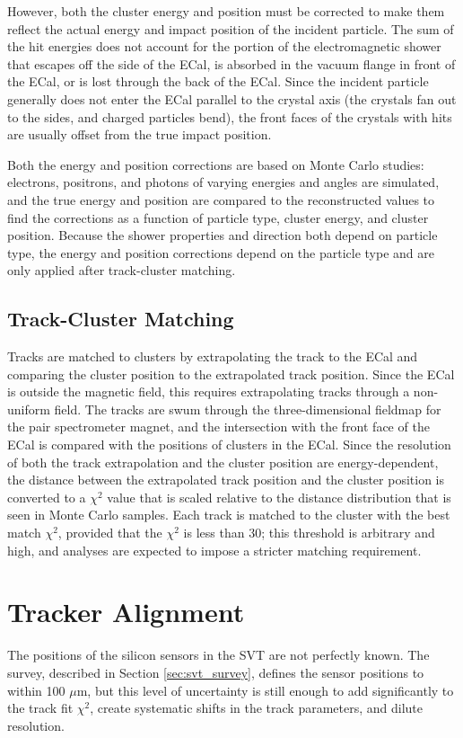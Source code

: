 However, both the cluster energy and position must be corrected to make them reflect the actual energy and impact position of the incident particle.
The sum of the hit energies does not account for the portion of the electromagnetic shower that escapes off the side of the ECal, is absorbed in the vacuum flange in front of the ECal, or is lost through the back of the ECal.
Since the incident particle generally does not enter the ECal parallel to the crystal axis (the crystals fan out to the sides, and charged particles bend), the front faces of the crystals with hits are usually offset from the true impact position.

Both the energy and position corrections are based on Monte Carlo studies: electrons, positrons, and photons of varying energies and angles are simulated, and the true energy and position are compared to the reconstructed values to find the corrections as a function of particle type, cluster energy, and cluster position.
Because the shower properties and direction both depend on particle type, the energy and position corrections depend on the particle type and are only applied after track-cluster matching.

\subsection{Track-Cluster Matching}
\label{sec:matching}
Tracks are matched to clusters by extrapolating the track to the ECal and comparing the cluster position to the extrapolated track position.
Since the ECal is outside the magnetic field, this requires extrapolating tracks through a non-uniform field.
The tracks are swum through the three-dimensional fieldmap for the pair spectrometer magnet, and the intersection with the front face of the ECal is compared with the positions of clusters in the ECal.
Since the resolution of both the track extrapolation and the cluster position are energy-dependent, the distance between the extrapolated track position and the cluster position is converted to a $\chi^2$ value that is scaled relative to the distance distribution that is seen in Monte Carlo samples.
Each track is matched to the cluster with the best match $\chi^2$, provided that the $\chi^2$ is less than 30; this threshold is arbitrary and high, and analyses are expected to impose a stricter matching requirement.

\section{Tracker Alignment}
The positions of the silicon sensors in the SVT are not perfectly known.
The survey, described in Section \ref{sec:svt_survey}, defines the sensor positions to within 100 $\mu$m, but this level of uncertainty is still enough to add significantly to the track fit $\chi^2$, create systematic shifts in the track parameters, and dilute resolution.

